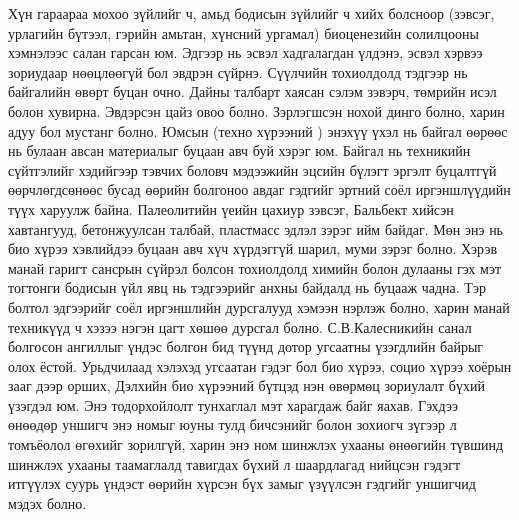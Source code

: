 Хүн гараараа мохоо зүйлийг ч, амьд бодисын зүйлийг ч хийх болсноор (зэвсэг, урлагийн бүтээл, гэрийн амьтан, хүнсний ургамал) биоценезийн солилцооны хэмнэлээс салан гарсан юм. Эдгээр нь эсвэл хадгалагдан үлдэнэ, эсвэл хэрвээ зориудаар нөөцлөөгүй бол эвдрэн сүйрнэ. Сүүлчийн тохиолдолд тэдгээр нь байгалийн өвөрт буцан очно. Дайны талбарт хаясан сэлэм зэвэрч, төмрийн исэл болон хувирна. Эвдэрсэн цайз овоо болно. Зэрлэгшсэн нохой динго болно, харин адуу бол мустанг болно. Юмсын (техно хүрээний ) энэхүү үхэл нь байгал өөрөөс нь булаан авсан материалыг буцаан авч буй хэрэг юм. Байгал нь техникийн сүйтгэлийг хэдийгээр тэвчих боловч мэдээжийн эцсийн бүлэгт эргэлт буцалтгүй өөрчлөгдсөнөөс бусад өөрийн болгоноо авдаг гэдгийг эртний соёл иргэншлүүдийн түүх харуулж байна. Палеолитийн үеийн цахиур зэвсэг, Бальбект хийсэн хавтангууд, бетонжуулсан талбай, пластмасс эдлэл зэрэг ийм байдаг. Мөн энэ нь био хүрээ хэвлийдээ буцаан авч хүч хүрдэггүй шарил, муми зэрэг болно. Хэрэв манай гаригт сансрын сүйрэл болсон тохиолдолд химийн болон дулааны гэх мэт тогтонги бодисын үйл явц нь тэдгээрийг анхны байдалд нь буцааж чадна. Тэр болтол эдгээрийг соёл иргэншлийн дурсгалууд хэмээн нэрлэж болно, харин манай техникүүд ч хэзээ нэгэн цагт хөшөө дурсгал болно.
С.В.Калесникийн санал болгосон ангиллыг үндэс болгон бид түүнд дотор угсаатны үзэгдлийн байрыг олох ёстой. Урьдчилаад хэлэхэд угсаатан гэдэг бол био хүрээ, социо хүрээ хоёрын зааг дээр орших, Дэлхийн био хүрээний бүтцэд нэн өвөрмөц зориулалт бүхий үзэгдэл юм. Энэ тодорхойлолт тунхаглал мэт харагдаж байг яахав. Гэхдээ өнөөдөр уншигч энэ номыг юуны тулд бичсэнийг болон зохиогч зүгээр л томъёолол өгөхийг зорилгүй, харин энэ ном шинжлэх ухааны өнөөгийн түвшинд шинжлэх ухааны таамаглалд тавигдах бүхий л шаардлагад нийцсэн гэдэгт итгүүлэх суурь үндэст өөрийн хүрсэн бүх замыг үзүүлсэн гэдгийг уншигчид мэдэх болно.

